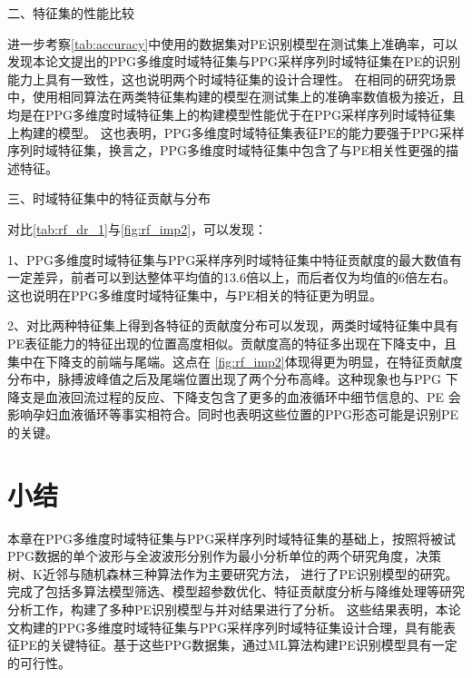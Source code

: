 二、特征集的性能比较

进一步考察\autoref{tab:accuracy}中使用的数据集对PE识别模型在测试集上准确率，可以发现本论文提出的PPG多维度时域特征集与PPG采样序列时域特征集在PE的识别能力上具有一致性，这也说明两个时域特征集的设计合理性。
在相同的研究场景中，使用相同算法在两类特征集构建的模型在测试集上的准确率数值极为接近，且均是在PPG多维度时域特征集上的构建模型性能优于在PPG采样序列时域特征集上构建的模型。
这也表明，PPG多维度时域特征集表征PE的能力要强于PPG采样序列时域特征集，换言之，PPG多维度时域特征集中包含了与PE相关性更强的描述特征。

三、时域特征集中的特征贡献与分布

对比\autoref{tab:rf_dr_1}与\autoref{fig:rf_imp2}，可以发现：

1、PPG多维度时域特征集与PPG采样序列时域特征集中特征贡献度的最大数值有一定差异，前者可以到达整体平均值的13.6倍以上，而后者仅为均值的6倍左右。这也说明在PPG多维度时域特征集中，与PE相关的特征更为明显。

2、对比两种特征集上得到各特征的贡献度分布可以发现，两类时域特征集中具有PE表征能力的特征出现的位置高度相似。贡献度高的特征多出现在下降支中，且集中在下降支的前端与尾端。这点在
\autoref{fig:rf_imp2}体现得更为明显，在特征贡献度分布中，脉搏波峰值之后及尾端位置出现了两个分布高峰。这种现象也与PPG
下降支是血液回流过程的反应、下降支包含了更多的血液循环中细节信息的、PE
会影响孕妇血液循环等事实相符合。同时也表明这些位置的PPG形态可能是识别PE的关键。

\section{小结}
本章在PPG多维度时域特征集与PPG采样序列时域特征集的基础上，按照将被试PPG数据的单个波形与全波波形分别作为最小分析单位的两个研究角度，决策树、K近邻与随机森林三种算法作为主要研究方法，
进行了PE识别模型的研究。
完成了包括多算法模型筛选、模型超参数优化、特征贡献度分析与降维处理等研究分析工作，构建了多种PE识别模型与并对结果进行了分析。
这些结果表明，本论文构建的PPG多维度时域特征集与PPG采样序列时域特征集设计合理，具有能表征PE的关键特征。基于这些PPG数据集，通过ML算法构建PE识别模型具有一定的可行性。